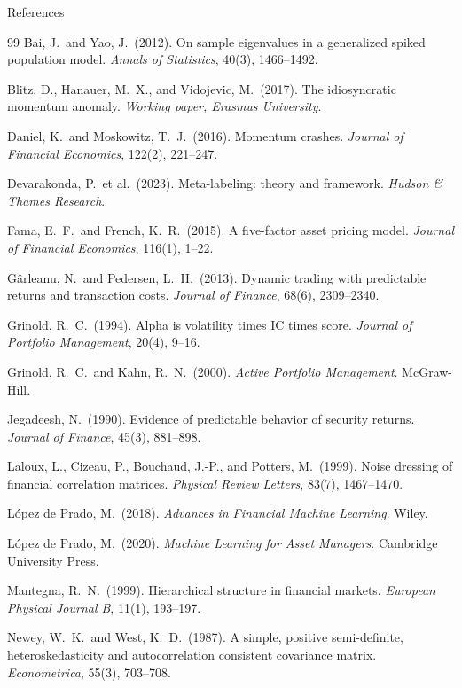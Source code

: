 \documentclass[10pt,aspectratio=169]{beamer}
\begin{document}
\begin{frame}[allowframebreaks]{References}
  \scriptsize
  \begin{thebibliography}{99}
     Bai, J.\ and Yao, J.\ (2012). On sample eigenvalues in a generalized spiked population model. \emph{Annals of Statistics}, 40(3), 1466--1492.

     Blitz, D., Hanauer, M.\ X., and Vidojevic, M.\ (2017). The idiosyncratic momentum anomaly. \emph{Working paper, Erasmus University}.

     Daniel, K.\ and Moskowitz, T.\ J.\ (2016). Momentum crashes. \emph{Journal of Financial Economics}, 122(2), 221--247.

     Devarakonda, P.\ et al.\ (2023). Meta-labeling: theory and framework. \emph{Hudson \& Thames Research}.

     Fama, E.\ F.\ and French, K.\ R.\ (2015). A five-factor asset pricing model. \emph{Journal of Financial Economics}, 116(1), 1--22.

     G\^{a}rleanu, N.\ and Pedersen, L.\ H.\ (2013). Dynamic trading with predictable returns and transaction costs. \emph{Journal of Finance}, 68(6), 2309--2340.

     Grinold, R.\ C.\ (1994). Alpha is volatility times IC times score. \emph{Journal of Portfolio Management}, 20(4), 9--16.

     Grinold, R.\ C.\ and Kahn, R.\ N.\ (2000). \emph{Active Portfolio Management}. McGraw-Hill.

     Jegadeesh, N.\ (1990). Evidence of predictable behavior of security returns. \emph{Journal of Finance}, 45(3), 881--898.

     Laloux, L., Cizeau, P., Bouchaud, J.-P., and Potters, M.\ (1999). Noise dressing of financial correlation matrices. \emph{Physical Review Letters}, 83(7), 1467--1470.

     L\'{o}pez de Prado, M.\ (2018). \emph{Advances in Financial Machine Learning}. Wiley.

     L\'{o}pez de Prado, M.\ (2020). \emph{Machine Learning for Asset Managers}. Cambridge University Press.

     Mantegna, R.\ N.\ (1999). Hierarchical structure in financial markets. \emph{European Physical Journal B}, 11(1), 193--197.

     Newey, W.\ K.\ and West, K.\ D.\ (1987). A simple, positive semi-definite, heteroskedasticity and autocorrelation consistent covariance matrix. \emph{Econometrica}, 55(3), 703--708.
  \end{thebibliography}
\end{frame}
\end{document}
